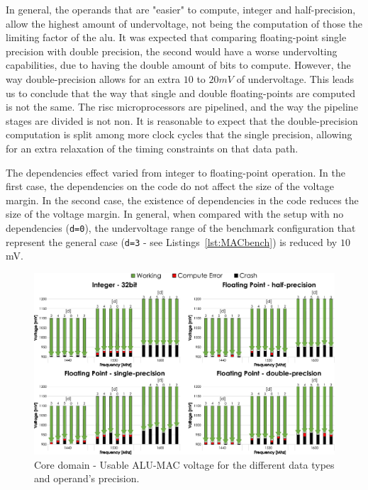 In general, the operands that are "easier" to compute, integer and half-precision, allow the highest amount of undervoltage, not being the computation of those the limiting factor of the \acrshort{alu}. 
It was expected that comparing floating-point single precision with double precision, the second would have a worse undervolting capabilities, due to having the double amount of bits to compute. However, the way double-precision allows for an extra $10$ to $20mV$ of undervoltage. This leads us to conclude that the way that single and double floating-points are computed is not the same. The \acrshort{risc} microprocessors are pipelined, and the way the pipeline stages are divided is not non. It is reasonable to expect that the double-precision computation is split among more clock cycles that the single precision, allowing for an extra relaxation of the timing constraints on that data path.

The dependencies effect varied from integer to floating-point operation. In the first case, the dependencies on the code do not affect the size of the voltage margin. In the second case, the existence of dependencies in the code reduces the size of the voltage margin. In general, when compared with the setup with no dependencies (\texttt{d=0}), the undervoltage range of the benchmark configuration that represent the general case (\texttt{d=3} - see Listings~\ref{lst:MACbench}) is reduced by $10$mV. 

\begin{figure}[htb]
  \centering
  \includegraphics[width=1\textwidth]{Figures/GPU_characterization/MAC_Guardband.pdf}
  \caption{Core domain - Usable ALU-MAC voltage for the different data types and operand's precision.}
  \label{fig:MAC_guardband}
\end{figure}

